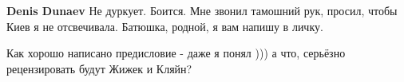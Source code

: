 \begin{itemize}
\begin{itemize} %
\textbf{Denis Dunaev} Не дуркует. Боится. Мне звонил тамошний рук, просил, чтобы Киев я не отсвечивала. Батюшка, родной, я вам напишу в личку.
\end{itemize} %

Как хорошо написано предисловие - даже я понял ))) а что, серьёзно рецензировать будут Жижек и Кляйн?

\end{itemize} %
